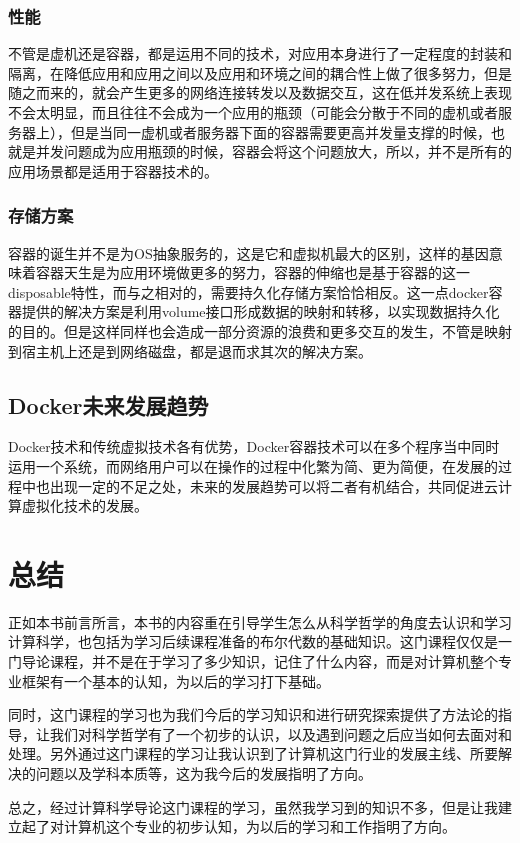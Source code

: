 \documentclass{article}
\begin{document}
\subsubsection{性能}
不管是虚机还是容器，都是运用不同的技术，对应用本身进行了一定程度的封装和隔离，在降低应用和应用之间以及应用和环境之间的耦合性上做了很多努力，但是随之而来的，就会产生更多的网络连接转发以及数据交互，这在低并发系统上表现不会太明显，而且往往不会成为一个应用的瓶颈（可能会分散于不同的虚机或者服务器上），但是当同一虚机或者服务器下面的容器需要更高并发量支撑的时候，也就是并发问题成为应用瓶颈的时候，容器会将这个问题放大，所以，并不是所有的应用场景都是适用于容器技术的。 

\subsubsection{存储方案}
容器的诞生并不是为OS抽象服务的，这是它和虚拟机最大的区别，这样的基因意味着容器天生是为应用环境做更多的努力，容器的伸缩也是基于容器的这一disposable特性，而与之相对的，需要持久化存储方案恰恰相反。这一点docker容器提供的解决方案是利用volume接口形成数据的映射和转移，以实现数据持久化的目的。但是这样同样也会造成一部分资源的浪费和更多交互的发生，不管是映射到宿主机上还是到网络磁盘，都是退而求其次的解决方案。

\subsection{Docker未来发展趋势}
Docker技术和传统虚拟技术各有优势，Docker容器技术可以在多个程序当中同时运用一个系统，而网络用户可以在操作的过程中化繁为简、更为简便，在发展的过程中也出现一定的不足之处，未来的发展趋势可以将二者有机结合，共同促进云计算虚拟化技术的发展。\citep{yunjisuan}


\section{总结}
正如本书前言所言，本书的内容重在引导学生怎么从科学哲学的角度去认识和学习计算科学，也包括为学习后续课程准备的布尔代数的基础知识。这门课程仅仅是一门导论课程，并不是在于学习了多少知识，记住了什么内容，而是对计算机整个专业框架有一个基本的认知，为以后的学习打下基础。
\par
同时，这门课程的学习也为我们今后的学习知识和进行研究探索提供了方法论的指导，让我们对科学哲学有了一个初步的认识，以及遇到问题之后应当如何去面对和处理。另外通过这门课程的学习让我认识到了计算机这门行业的发展主线、所要解决的问题以及学科本质等，这为我今后的发展指明了方向。
\par
总之，经过计算科学导论这门课程的学习，虽然我学习到的知识不多，但是让我建立起了对计算机这个专业的初步认知，为以后的学习和工作指明了方向。
\end{document}
